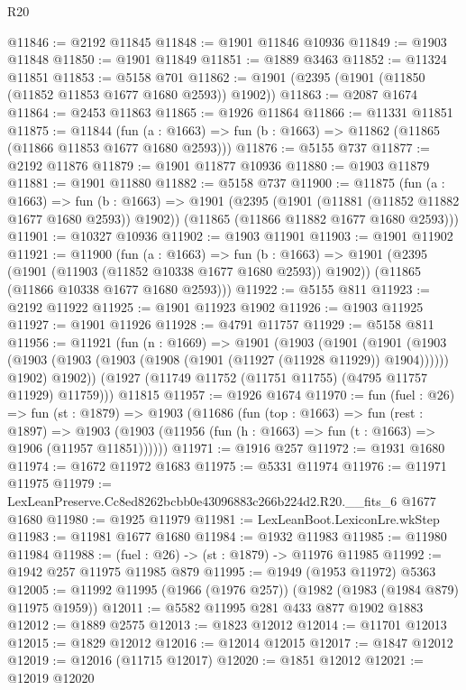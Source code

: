 \begin{lexlean}{R20}
\begin{coremodule}
@11846 := @2192 @11845
@11848 := @1901 @11846 @10936
@11849 := @1903 @11848
@11850 := @1901 @11849
@11851 := @1889 @3463
@11852 := @11324 @11851
@11853 := @5158 @701
@11862 := @1901 (@2395 (@1901 (@11850 (@11852 @11853 @1677 @1680 @2593)) @1902))
@11863 := @2087 @1674
@11864 := @2453 @11863
@11865 := @1926 @11864
@11866 := @11331 @11851
@11875 := @11844
    (fun (a : @1663) => fun (b : @1663) => @11862 (@11865 (@11866 @11853 @1677 @1680 @2593)))
@11876 := @5155 @737
@11877 := @2192 @11876
@11879 := @1901 @11877 @10936
@11880 := @1903 @11879
@11881 := @1901 @11880
@11882 := @5158 @737
@11900 := @11875
    (fun (a : @1663) =>
    fun (b : @1663) =>
    @1901
      (@2395 (@1901 (@11881 (@11852 @11882 @1677 @1680 @2593)) @1902))
      (@11865 (@11866 @11882 @1677 @1680 @2593)))
@11901 := @10327 @10936
@11902 := @1903 @11901
@11903 := @1901 @11902
@11921 := @11900
    (fun (a : @1663) =>
    fun (b : @1663) =>
    @1901
      (@2395 (@1901 (@11903 (@11852 @10338 @1677 @1680 @2593)) @1902))
      (@11865 (@11866 @10338 @1677 @1680 @2593)))
@11922 := @5155 @811
@11923 := @2192 @11922
@11925 := @1901 @11923 @1902
@11926 := @1903 @11925
@11927 := @1901 @11926
@11928 := @4791 @11757
@11929 := @5158 @811
@11956 := @11921
    (fun (n : @1669) =>
    @1901
      (@1903
        (@1901
          (@1901
            (@1903 (@1903 (@1903 (@1903 (@1908 (@1901 (@11927 (@11928 @11929)) @1904))))))
            @1902)
          @1902))
      (@1927 (@11749 @11752 (@11751 @11755) (@4795 @11757 @11929) @11759)))
    @11815
@11957 := @1926 @1674
@11970 := fun (fuel : @26) =>
  fun (st : @1879) =>
  @1903
    (@11686
      (fun (top : @1663) =>
      fun (rest : @1897) =>
      @1903 (@1903 (@11956 (fun (h : @1663) => fun (t : @1663) => @1906 (@11957 @11851))))))
@11971 := @1916 @257
@11972 := @1931 @1680
@11974 := @1672 @11972 @1683
@11975 := @5331 @11974
@11976 := @11971 @11975
@11979 := LexLeanPreserve.Cc8ed8262bcbb0e43096883c266b224d2.R20.__fits_6 @1677 @1680
@11980 := @1925 @11979
@11981 := LexLeanBoot.LexiconLre.wkStep
@11983 := @11981 @1677 @1680
@11984 := @1932 @11983
@11985 := @11980 @11984
@11988 := (fuel : @26) -> (st : @1879) -> @11976 @11985
@11992 := @1942 @257 @11975 @11985 @879
@11995 := @1949 (@1953 @11972) @5363
@12005 := @11992 @11995 (@1966 (@1976 @257)) (@1982 (@1983 (@1984 @879) @11975 @1959))
@12011 := @5582 @11995 @281 @433 @877 @1902 @1883
@12012 := @1889 @2575
@12013 := @1823 @12012
@12014 := @11701 @12013
@12015 := @1829 @12012
@12016 := @12014 @12015
@12017 := @1847 @12012
@12019 := @12016 (@11715 @12017)
@12020 := @1851 @12012
@12021 := @12019 @12020

\end{coremodule}
\end{lexlean}
